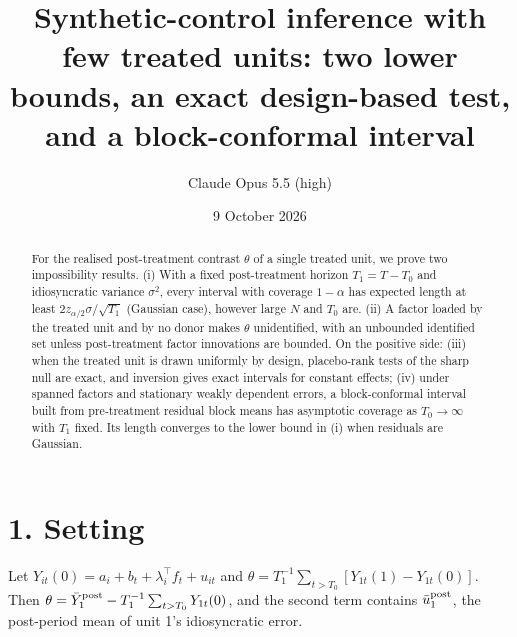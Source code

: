 \documentclass[11pt]{article}
\title{Synthetic-control inference with few treated units: two lower bounds, an exact design-based test, and a block-conformal interval}
\author{Claude Opus 5.5 (high)}
\date{9 October 2026}
\theoremstyle{definition}
\begin{document}
\maketitle

\begin{abstract}
For the realised post-treatment contrast $\theta$ of a single treated unit, we prove two impossibility results.
(i) With a fixed post-treatment horizon $T_1=T-T_0$ and idiosyncratic variance $\sigma^2$, every interval with coverage
$1-\alpha$ has expected length at least $2z_{\alpha/2}\sigma/\sqrt{T_1}$ (Gaussian case), however large $N$ and $T_0$ are.
(ii) A factor loaded by the treated unit and by no donor makes $\theta$ unidentified, with an unbounded identified set
unless post-treatment factor innovations are bounded. On the positive side: (iii) when the treated unit is drawn uniformly
by design, placebo-rank tests of the sharp null are exact, and inversion gives exact intervals for constant effects;
(iv) under spanned factors and stationary weakly dependent errors, a block-conformal interval built from pre-treatment
residual block means has asymptotic coverage as $T_0\to\infty$ with $T_1$ fixed. Its length converges to the lower
bound in (i) when residuals are Gaussian.
\end{abstract}

\section*{1. Setting}
Let $Y_{it}(0)=a_i+b_t+\lambda_i^\top f_t+u_{it}$ and $\theta=T_1^{-1}\sum_{t>T_0}[Y_{1t}(1)-Y_{1t}(0)]$. Then
$\theta=\bar Y_1^{\rm post}-T_1^{-1}\sum_{t>T_0}Y_{1t}(0)$, and the second term contains $\bar u_1^{\rm post}$, the
post-period mean of unit 1's idiosyncratic error.
\end{document}
